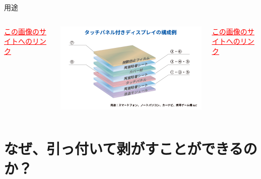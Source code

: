 \documentclass[unicode,12pt]{beamer}%
\begin{document}
\begin{frame}
\begin{block}{用途}
\begin{columns}[c, onlytextwidth]
				\vspace{-2mm}
				\href{https://www.lintec.co.jp/dream/tsunagu/products/03/}{\textcolor{red}{\underline{\scriptsize{この画像のサイトへのリンク}}}}

				\centering
				\includegraphics[width=\textwidth]{touchpanel.png}

				\vspace{-2mm}
				\href{https://www.ojiholdings.co.jp/r_d/theme/hffilm.html}{\textcolor{red}{\underline{\scriptsize{この画像のサイトへのリンク}}}}
			\end{columns}
		\end{block}
\end{frame}

\section{なぜ、引っ付いて剥がすことができるのか？}
\end{document}
